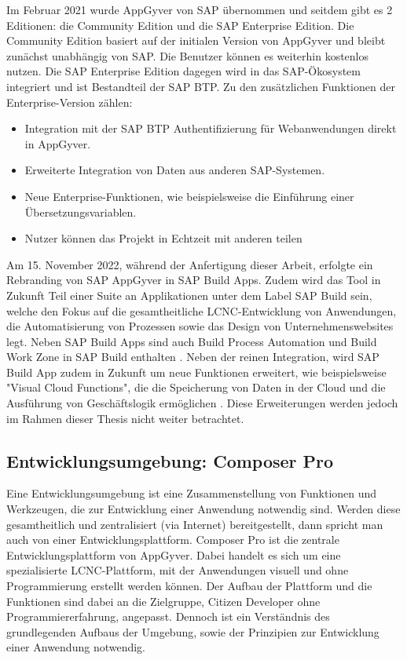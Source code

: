 Im Februar 2021 wurde AppGyver von SAP übernommen und seitdem gibt es 2 Editionen: die Community Edition und die SAP Enterprise Edition. Die Community Edition basiert auf der initialen Version von AppGyver und bleibt zunächst unabhängig von SAP. Die Benutzer können es weiterhin kostenlos nutzen. Die SAP Enterprise Edition dagegen wird in das SAP-Ökosystem integriert und ist Bestandteil der SAP BTP. Zu den zusätzlichen Funktionen der Enterprise-Version zählen: 
 
\begin{itemize}[noitemsep]
\item Integration mit der SAP BTP Authentifizierung für Webanwendungen direkt in AppGyver.
\item Erweiterte Integration von Daten aus anderen SAP-Systemen.
\item Neue Enterprise-Funktionen, wie beispielsweise die Einführung einer Übersetzungsvariablen.
\item Nutzer können das Projekt in Echtzeit mit anderen teilen
\end{itemize}

Am 15. November 2022, während der Anfertigung dieser Arbeit, erfolgte ein Rebranding von SAP AppGyver in SAP Build Apps. Zudem wird das Tool in Zukunft Teil einer Suite an Applikationen unter dem Label SAP Build sein, welche den Fokus auf die gesamtheitliche LCNC-Entwicklung von Anwendungen, die Automatisierung von Prozessen sowie das Design von Unternehmenswebsites legt. Neben SAP Build Apps sind auch Build Process Automation und Build Work Zone in SAP Build enthalten \cite{sap:lcnc}. Neben der reinen Integration, wird SAP Build App zudem in Zukunft um neue Funktionen erweitert, wie beispielsweise "Visual Cloud Functions", die die Speicherung von Daten in der Cloud und die Ausführung von Geschäftslogik ermöglichen \cite{appgyver:coman}. Diese Erweiterungen werden jedoch im Rahmen dieser Thesis nicht weiter betrachtet.

\subsection{Entwicklungsumgebung: Composer Pro}
Eine Entwicklungsumgebung ist eine Zusammenstellung von Funktionen und Werkzeugen, die zur Entwicklung einer Anwendung notwendig sind. Werden diese gesamtheitlich und zentralisiert (via Internet) bereitgestellt, dann spricht man auch von einer Entwicklungsplattform. Composer Pro ist die zentrale Entwicklungsplattform von AppGyver. Dabei handelt es sich um eine spezialisierte LCNC-Plattform, mit der Anwendungen visuell und ohne Programmierung erstellt werden können. Der Aufbau der Plattform und die Funktionen sind dabei an die Zielgruppe, Citizen Developer ohne Programmiererfahrung, angepasst. Dennoch ist ein Verständnis des grundlegenden Aufbaus der Umgebung, sowie der Prinzipien zur Entwicklung einer Anwendung notwendig.


